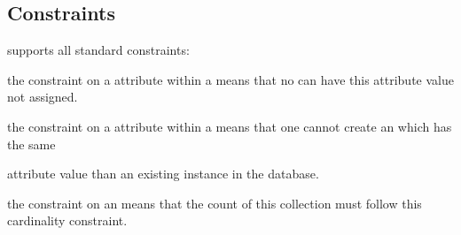 \subsection{Constraints}
\eyedb supports all standard constraints:
\bi
\item the  constraint on a attribute within
a  means that no  can have
this attribute value not assigned.
\item the  constraint on a attribute within a 
means that one cannot create an  which has the same 

attribute value than an existing instance in the database.
\item the  constraint on an  means
that the count of this collection must follow this cardinality constraint.
\ei
